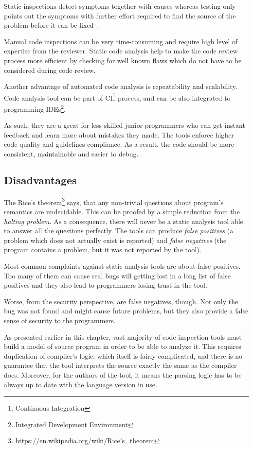 \documentclass[
  digital, %
  table,   %
  lof,     %
  lot,     %
  oneside,
]{fithesis3}
\begin{document}
Static inspections detect symptoms together with causes whereas testing only points out the symptoms with further effort required to find the source of the problem before it can be fixed~\cite[p. 472]{code-complete}.

Manual code inspections can be very time-consuming and require high level of expertise from the reviewer. Static code analysis help to make the code review process more efficient by checking for well known flaws which do not have to be considered during code review.

Another advantage of automated code analysis is repeatability and scalability. Code analysis tool can be part of CI\footnote{Continuous Integration} process, and can be also integrated to programming IDEs\footnote{Integrated Development Environment}. 

As such, they are a great for less skilled junior programmers who can get instant feedback and learn more about mistakes they made. The tools enforce higher code quality and guidelines compliance. As a result, the code should be more consistent, maintainable and easier to debug.
  
\subsection{Disadvantages}
The Rice's theorem\footnote{https://en.wikipedia.org/wiki/Rice's\_theorem} says, that any non-trivial questions about program's semantics are undecidable. This can be proofed by a simple reduction from the \textit{halting problem}. As a consequence, there will never be a static analysis tool able to answer all the questions perfectly. The tools can produce \textit{false positives} (a problem which does not actually exist is reported) and \textit{false negatives} (the program contains a problem, but it was not reported by the tool).

Most common complaints against static analysis tools are about false positives. Too many of them can cause real bugs will getting lost in a long list of false positives and they also lead to programmers losing trust in the tool.

Worse, from the security perspective, are false negatives, though. Not only the bug was not found and might cause future problems, but they also provide a false sense of security to the programmers. 

As presented earlier in this chapter, vast majority of code inspection tools must build a model of source program in order to be able to analyze it. This requires duplication of compiler's logic, which itself is fairly complicated, and there is no guarantee that the tool interprets the source exactly the same as the compiler does. Moreover, for the authors of the tool, it means the parsing logic has to be always up to date with the language version in use. 
\end{document}
